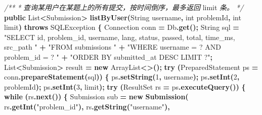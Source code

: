 \documentclass[
  11pt,
]{ctexart}
\newenvironment{Shaded}{\begin{snugshade}}{\end{snugshade}}
\newcommand{\BuiltInTok}[1]{#1}
\newcommand{\CommentTok}[1]{\textcolor[rgb]{0.56,0.35,0.01}{\textit{#1}}}
\newcommand{\ControlFlowTok}[1]{\textcolor[rgb]{0.13,0.29,0.53}{\textbf{#1}}}
\newcommand{\DataTypeTok}[1]{\textcolor[rgb]{0.13,0.29,0.53}{#1}}
\newcommand{\DecValTok}[1]{\textcolor[rgb]{0.00,0.00,0.81}{#1}}
\newcommand{\FunctionTok}[1]{\textcolor[rgb]{0.13,0.29,0.53}{\textbf{#1}}}
\newcommand{\KeywordTok}[1]{\textcolor[rgb]{0.13,0.29,0.53}{\textbf{#1}}}
\newcommand{\NormalTok}[1]{#1}
\newcommand{\OperatorTok}[1]{\textcolor[rgb]{0.81,0.36,0.00}{\textbf{#1}}}
\newcommand{\StringTok}[1]{\textcolor[rgb]{0.31,0.60,0.02}{#1}}
\begin{document}
\begin{Shaded}
\begin{Highlighting}[]
    \CommentTok{/**}
     \CommentTok{*} \CommentTok{查询某用户在某题上的所有提交，按时间倒序，最多返回}\NormalTok{ limit }\CommentTok{条。}
     \CommentTok{*/}
    \KeywordTok{public} \BuiltInTok{List}\OperatorTok{\textless{}}\NormalTok{Submission}\OperatorTok{\textgreater{}} \FunctionTok{listByUser}\OperatorTok{(}\BuiltInTok{String}\NormalTok{ username}\OperatorTok{,} \DataTypeTok{int}\NormalTok{ problemId}\OperatorTok{,} \DataTypeTok{int}\NormalTok{ limit}\OperatorTok{)} \KeywordTok{throws} \BuiltInTok{SQLException} \OperatorTok{\{}
        \BuiltInTok{Connection}\NormalTok{ conn }\OperatorTok{=}\NormalTok{ Db}\OperatorTok{.}\FunctionTok{get}\OperatorTok{();}
        \BuiltInTok{String}\NormalTok{ sql }\OperatorTok{=} \StringTok{"SELECT id, problem\_id, username, lang, status, passed, total, time\_ms, src\_path "} \OperatorTok{+}
                     \StringTok{"FROM submissions "} \OperatorTok{+}
                     \StringTok{"WHERE username = ? AND problem\_id = ? "} \OperatorTok{+}
                     \StringTok{"ORDER BY submitted\_at DESC LIMIT ?"}\OperatorTok{;}
        \BuiltInTok{List}\OperatorTok{\textless{}}\NormalTok{Submission}\OperatorTok{\textgreater{}}\NormalTok{ result }\OperatorTok{=} \KeywordTok{new} \BuiltInTok{ArrayList}\OperatorTok{\textless{}\textgreater{}();}
        \ControlFlowTok{try} \OperatorTok{(}\BuiltInTok{PreparedStatement}\NormalTok{ ps }\OperatorTok{=}\NormalTok{ conn}\OperatorTok{.}\FunctionTok{prepareStatement}\OperatorTok{(}\NormalTok{sql}\OperatorTok{))} \OperatorTok{\{}
\NormalTok{            ps}\OperatorTok{.}\FunctionTok{setString}\OperatorTok{(}\DecValTok{1}\OperatorTok{,}\NormalTok{ username}\OperatorTok{);}
\NormalTok{            ps}\OperatorTok{.}\FunctionTok{setInt}\OperatorTok{(}\DecValTok{2}\OperatorTok{,}\NormalTok{ problemId}\OperatorTok{);}
\NormalTok{            ps}\OperatorTok{.}\FunctionTok{setInt}\OperatorTok{(}\DecValTok{3}\OperatorTok{,}\NormalTok{ limit}\OperatorTok{);}
            \ControlFlowTok{try} \OperatorTok{(}\BuiltInTok{ResultSet}\NormalTok{ rs }\OperatorTok{=}\NormalTok{ ps}\OperatorTok{.}\FunctionTok{executeQuery}\OperatorTok{())} \OperatorTok{\{}
                \ControlFlowTok{while} \OperatorTok{(}\NormalTok{rs}\OperatorTok{.}\FunctionTok{next}\OperatorTok{())} \OperatorTok{\{}
\NormalTok{                    Submission sub }\OperatorTok{=} \KeywordTok{new} \FunctionTok{Submission}\OperatorTok{(}
\NormalTok{                        rs}\OperatorTok{.}\FunctionTok{getInt}\OperatorTok{(}\StringTok{"problem\_id"}\OperatorTok{),}
\NormalTok{                        rs}\OperatorTok{.}\FunctionTok{getString}\OperatorTok{(}\StringTok{"username"}\OperatorTok{),}

\end{Highlighting}
\end{Shaded}
\end{document}
